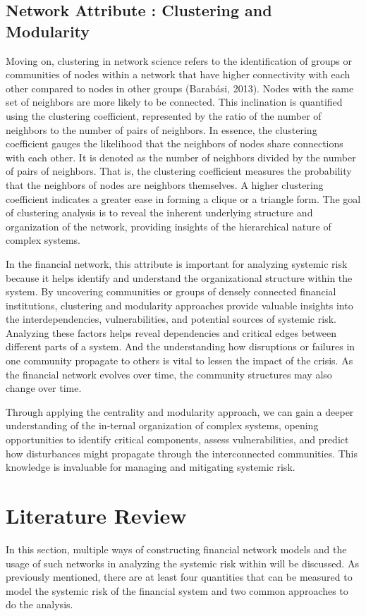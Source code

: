 \documentclass[a4paper,11pt]{article}
\begin{document}
\subsection{Network Attribute : Clustering and Modularity}
Moving on, clustering in network science refers to the identification of groups or communities of nodes within a network that have higher connectivity with each other compared to nodes in other groups (Barabási, 2013). Nodes with the same set of neighbors are more likely to be connected. This inclination is quantified using the clustering coefficient, represented by the ratio of the number of neighbors to the number of pairs of neighbors. In essence, the clustering coefficient gauges the likelihood that the neighbors of nodes share connections with each other. It is denoted as the number of neighbors divided by the number of pairs of neighbors. That is, the clustering coefficient measures the probability that the neighbors of nodes are neighbors themselves. A higher clustering coefficient indicates a greater ease in forming a clique or a triangle form. The goal of clustering analysis is to reveal the inherent underlying structure and organization of the network, providing insights of the hierarchical nature of complex systems.

In the financial network, this attribute is important for analyzing systemic risk because it helps identify and understand the organizational structure within the system. By uncovering communities or groups of densely connected financial institutions, clustering and modularity approaches provide valuable insights into the interdependencies, vulnerabilities, and potential sources of systemic risk. Analyzing these factors helps reveal dependencies and critical edges between different parts of a system. And the understanding how disruptions or failures in one community propagate to others is vital to lessen the impact of the crisis. As the financial network evolves over time, the community structures may also change over time.

Through applying the centrality and modularity approach, we can gain a deeper understanding of the in-ternal organization of complex systems, opening opportunities to identify critical components, assess vulnerabilities, and predict how disturbances might propagate through the interconnected communities. This knowledge is invaluable for managing and mitigating systemic risk.

\section{Literature Review}
In this section, multiple ways of constructing financial network models and the usage of such networks in analyzing the systemic risk within will be discussed. As previously mentioned, there are at least four quantities that can be measured to model the systemic risk of the financial system and two common approaches to do the analysis.
\end{document}
